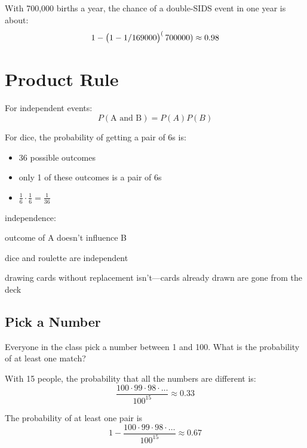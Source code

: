 \documentclass[letterpaper, landscape]{exam}
\begin{document}
  With 700,000 births a year, the chance of a double-SIDS event in one year is
  about:
  \[
    1 - \del{ 1 - 1/169000 }^(700000) \approx 0.98
  \]

  \section{Product Rule}

  For independent events:
  \[
    P(\text{A and B}) = P(A) P(B)
  \]

  For dice, the probability of getting a pair of 6s is:
  \begin{itemize}
    \item 36 possible outcomes
    \item only 1 of these outcomes is a pair of 6s
    \item $\frac{1}{6} \cdot \frac{1}{6} = \frac{1}{36}$
  \end{itemize}


  independence:
  \begin{itemize*}
    \item outcome of A doesn't influence B
    \item dice and roulette are independent
    \item drawing cards without replacement isn't---cards already drawn are gone
      from the deck
  \end{itemize*}

  \subsection{Pick a Number}
  Everyone in the class pick a number between 1 and 100. What is the probability
  of at least one match?

  \begin{solution}
    With 15 people, the probability that all the numbers are different is:
    \[
      \frac{100 \cdot 99 \cdot 98 \cdot \ldots}{100^{15}} \approx 0.33
    \]

    The probability of at least one pair is
    \[
      1 - \frac{100 \cdot 99 \cdot 98 \cdot \ldots}{100^{15}} \approx \boxed{ 0.67 }
    \]
  \end{solution}
\end{document}
